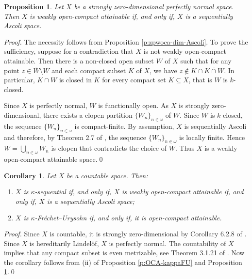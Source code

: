 \documentclass[preprint,11pt]{elsarticle}
\newtheorem{corollary}[theorem]{Corollary}
\newtheorem{proposition}[theorem]{Proposition}
\numberwithin{equation}{section}
\numberwithin{theorem}{section}
\newcommand{\w}{\omega}
\newcommand{\SM}{{\setminus}}
\begin{document}
\begin{proposition} \label{p:zpwoca-dim-Ascoli-perfectly-normal}
Let $X$ be a strongly zero-dimensional perfectly normal space. Then $X$ is weakly open-compact attainable if, and only if, $X$ is a sequentially Ascoli space.
\end{proposition}

\begin{proof}
The necessity follows from Proposition \ref{p:zpwoca-dim-Ascoli}. To prove the sufficiency, suppose for a contradiction that $X$ is not weakly open-compact attainable. Then there is a non-closed open subset $W$ of $X$ such that for any point $z\in \overline{W}\SM W$ and each compact subset $K$ of $X$, we have $z\not\in K\cap \overline{K\cap W}$. In particular, $K\cap W$ is closed in $K$ for every compact set $K\subseteq X$, that is $W$ is $k$-closed.

Since $X$ is perfectly normal, $W$ is functionally open. As $X$ is strongly zero-dimensional, there exists a clopen partition $\{W_n\}_{n\in\w}$ of $W$.
Since $W$ is $k$-closed, the sequence $\{W_n\}_{n\in\w}$ is compact-finite. By assumption, $X$ is sequentially Ascoli and therefore, by Theorem 2.7 of \cite{Gabr-seq-Ascoli}, the sequence  $\{W_n\}_{n\in\w}$  is locally finite. Hence $W=\bigcup_{n\in\w} W_n$ is clopen that contradicts the choice of $W$.
Thus $X$ is a weakly open-compact attainable space.\qed
\end{proof}




\begin{corollary} \label{c:counable-X-woca-Seq-Ascoli}
Let $X$ be a countable space. Then:
\begin{enumerate}
\item[{\rm(i)}] $X$ is $\kappa$-sequential if, and only if, $X$ is weakly open-compact attainable if, and only if,  $X$ is a sequentially Ascoli space;
\item[{\rm(ii)}] $X$ is $\kappa$-Fr\'{e}chet--Urysohn if, and only if, it is open-compact attainable.
\end{enumerate}
\end{corollary}


\begin{proof}
Since $X$ is countable, it is strongly zero-dimensional by Corollary 6.2.8 of \cite{Eng}. Since $X$ is hereditarily Lindel\"{o}f, $X$ is perfectly normal.
The countability of $X$ implies that any compact subset is even metrizable, see Theorem 3.1.21 of \cite{Eng}. Now the corollary follows from (ii) of Proposition \ref{p:OCA-kappaFU} and Proposition \ref{p:zpwoca-dim-Ascoli-perfectly-normal}.\qed
\end{proof}
\end{document}
